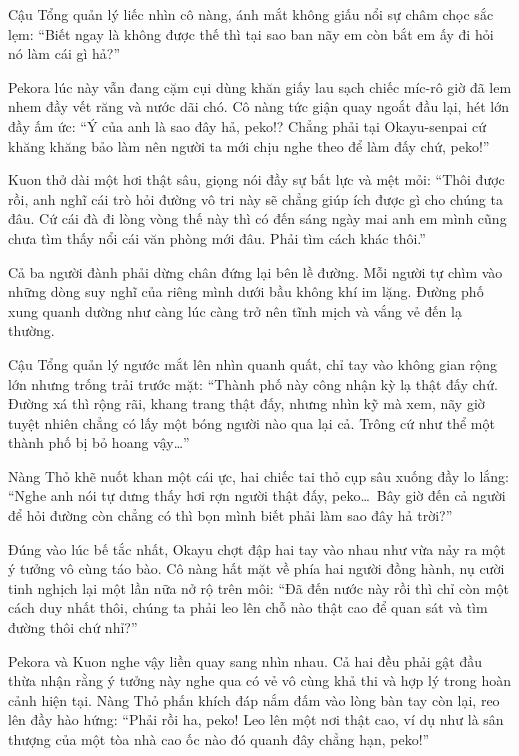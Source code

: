 \documentclass[../main.tex]{subfiles}
\begin{document}
Cậu Tổng quản lý liếc nhìn cô nàng, ánh mắt không giấu nổi sự châm chọc sắc lẹm: ``Biết ngay là không được thế thì tại sao ban nãy em còn bắt em ấy đi hỏi nó làm cái gì hả?''

Pekora lúc này vẫn đang cặm cụi dùng khăn giấy lau sạch chiếc míc-rô giờ đã lem nhem đầy vết răng và nước dãi chó. Cô nàng tức giận quay ngoắt đầu lại, hét lớn đầy ấm ức: ``Ý của anh là sao đây hả, peko!? Chẳng phải tại Okayu-senpai cứ khăng khăng bảo làm nên người ta mới chịu nghe theo để làm đấy chứ, peko!''

Kuon thở dài một hơi thật sâu, giọng nói đầy sự bất lực và mệt mỏi: ``Thôi được rồi, anh nghĩ cái trò hỏi đường vô tri này sẽ chẳng giúp ích được gì cho chúng ta đâu. Cứ cái đà đi lòng vòng thế này thì có đến sáng ngày mai anh em mình cũng chưa tìm thấy nổi cái văn phòng mới đâu. Phải tìm cách khác thôi.''

Cả ba người đành phải dừng chân đứng lại bên lề đường. Mỗi người tự chìm vào những dòng suy nghĩ của riêng mình dưới bầu không khí im lặng. Đường phố xung quanh dường như càng lúc càng trở nên tĩnh mịch và vắng vẻ đến lạ thường.

Cậu Tổng quản lý ngước mắt lên nhìn quanh quất, chỉ tay vào không gian rộng lớn nhưng trống trải trước mặt: ``Thành phố này công nhận kỳ lạ thật đấy chứ. Đường xá thì rộng rãi, khang trang thật đấy, nhưng nhìn kỹ mà xem, nãy giờ tuyệt nhiên chẳng có lấy một bóng người nào qua lại cả. Trông cứ như thể một thành phố bị bỏ hoang vậy\dots''

Nàng Thỏ khẽ nuốt khan một cái ực, hai chiếc tai thỏ cụp sâu xuống đầy lo lắng: ``Nghe anh nói tự dưng thấy hơi rợn người thật đấy, peko\dots\ Bây giờ đến cả người để hỏi đường còn chẳng có thì bọn mình biết phải làm sao đây hả trời?''

Đúng vào lúc bế tắc nhất, Okayu chợt đập hai tay vào nhau như vừa nảy ra một ý tưởng vô cùng táo bào. Cô nàng hất mặt về phía hai người đồng hành, nụ cười tinh nghịch lại một lần nữa nở rộ trên môi: ``Đã đến nước này rồi thì chỉ còn một cách duy nhất thôi, chúng ta phải leo lên chỗ nào thật cao để quan sát và tìm đường thôi chứ nhỉ?''

Pekora và Kuon nghe vậy liền quay sang nhìn nhau. Cả hai đều phải gật đầu thừa nhận rằng ý tưởng này nghe qua có vẻ vô cùng khả thi và hợp lý trong hoàn cảnh hiện tại. Nàng Thỏ phấn khích đáp nắm đấm vào lòng bàn tay còn lại, reo lên đầy hào hứng: ``Phải rồi ha, peko! Leo lên một nơi thật cao, ví dụ như là sân thượng của một tòa nhà cao ốc nào đó quanh đây chẳng hạn, peko!''
\end{document}
